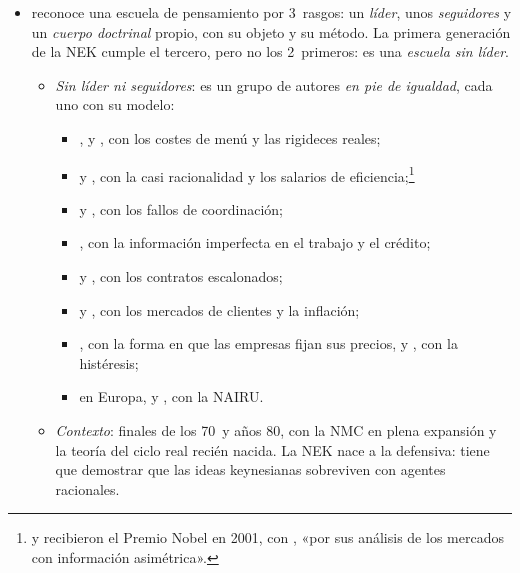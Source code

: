 \documentclass[11pt]{article}
\begin{document}
\begin{itemize}
\item {} reconoce una escuela de pensamiento por 3~rasgos: un \emph{líder}, unos \emph{seguidores} y un \emph{cuerpo doctrinal} propio, con su objeto y su método\nocite{Schumpeter1954History}. La primera generación de la NEK cumple el tercero, pero no los 2~primeros: es una \emph{escuela sin líder}.
  \begin{itemize}
  \item \emph{Sin líder ni seguidores}: es un grupo de autores \emph{en pie de igualdad}, cada uno con su modelo:
    \begin{itemize}
    \item {},  y , con los costes de menú y las rigideces reales;
    \item {} y , con la casi racionalidad y los salarios de eficiencia;\footnote{ y  recibieron el Premio Nobel en 2001, con , «por sus análisis de los mercados con información asimétrica»\nocite{Nobel2001AkerlofSpenceStiglitz}.}
    \item {} y , con los fallos de coordinación;
    \item {}, con la información imperfecta en el trabajo y el crédito;
    \item {} y , con los contratos escalonados;
    \item {} y , con los mercados de clientes y la inflación;
    \item {}, con la forma en que las empresas fijan sus precios, y , con la histéresis;
    \item en Europa,  y , con la NAIRU.
    \end{itemize}
  \item \emph{Contexto}: finales de los 70~y años 80, con la NMC en plena expansión y la teoría del ciclo real recién nacida. La NEK nace a la defensiva: tiene que demostrar que las ideas keynesianas sobreviven con agentes racionales.

\end{itemize}
\end{itemize}
\end{document}
